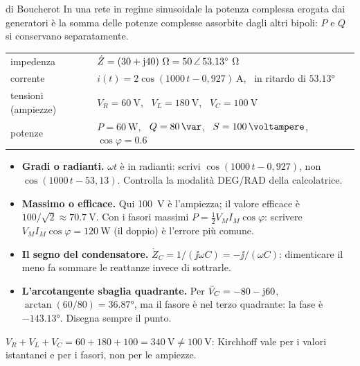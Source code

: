 \documentclass[10pt]{article}
\begin{document}
\begin{teorema}{di Boucherot}
In una rete in regime sinusoidale la potenza complessa erogata dai generatori è la somma delle potenze
complesse assorbite dagli altri bipoli: $P$ e $Q$ si conservano separatamente.
\end{teorema}

\begin{risultato}
\renewcommand{\arraystretch}{1.25}
\begin{tabular}{@{}l@{\qquad}l@{}}
  impedenza & $\dot Z = (30 + \jj 40)\ \unit{\ohm} = \polare{50}{53.13}\ \unit{\ohm}$ \\
  corrente  & $i(t) = 2\cos(1000\,t - 0{,}927)\ \unit{\ampere}$, \ in ritardo di $\ang{53.13}$ \\
  tensioni (ampiezze) & $V_R = \qty{60}{\volt}$, \ $V_L = \qty{180}{\volt}$, \ $V_C = \qty{100}{\volt}$ \\
  potenze   & $P = \qty{60}{\watt}$, \ $Q = \qty{80}{\var}$, \ $S = \qty{100}{\voltampere}$, \ $\cos\varphi = \num{0.6}$
\end{tabular}
\end{risultato}

\begin{attenzione}
\begin{itemize}
  \item \textbf{Gradi o radianti.} $\omega t$ è in radianti: scrivi $\cos(1000\,t - 0{,}927)$, non
        $\cos(1000\,t - 53{,}13)$. Controlla la modalità DEG/RAD della calcolatrice.
  \item \textbf{Massimo o efficace.} Qui \qty{100}{\volt} è l'ampiezza; il valore efficace è
        $100/\sqrt2 \approx \qty{70.7}{\volt}$. Con i fasori massimi $P = \tfrac12 V_M I_M\cos\varphi$: scrivere
        $V_M I_M \cos\varphi = \qty{120}{\watt}$ (il doppio) è l'errore più comune.
  \item \textbf{Il segno del condensatore.} $\dot Z_C = 1/(\jj\omega C) = -\jj/(\omega C)$: dimenticare il meno fa
        sommare le reattanze invece di sottrarle.
  \item \textbf{L'arcotangente sbaglia quadrante.} Per $\bar{V}_C = -80 - \mathrm{j} 60$, $\arctan(60/80) = \ang{36.87}$, ma il
        fasore è nel terzo quadrante: la fase è $\ang{-143.13}$. Disegna sempre il punto.
\end{itemize}
\end{attenzione}

\begin{controesempio}
$V_R + V_L + V_C = 60 + 180 + 100 = \qty{340}{\volt} \neq \qty{100}{\volt}$: Kirchhoff vale per i valori istantanei e per i fasori, non per le ampiezze.
\end{controesempio}
\end{document}
